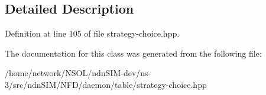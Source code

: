 \subsection{Detailed Description}


Definition at line 105 of file strategy-\/choice.\+hpp.



The documentation for this class was generated from the following file\+:\begin{DoxyCompactItemize}
\item 
/home/network/\+N\+S\+O\+L/ndn\+S\+I\+M-\/dev/ns-\/3/src/ndn\+S\+I\+M/\+N\+F\+D/daemon/table/strategy-\/choice.\+hpp\end{DoxyCompactItemize}
